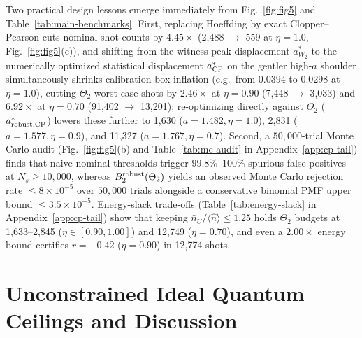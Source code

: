 \documentclass{iopjournal}
\newcommand{\nU}{\bar n_U}
\begin{document}
Two practical design lessons emerge immediately from Fig.~\ref{fig:fig5} and Table~\ref{tab:main-benchmarks}. First, replacing Hoeffding by exact Clopper--Pearson cuts nominal shot counts by $4.45\times$ (2,488 $\to$ 559 at $\eta = 1.0$, Fig.~\ref{fig:fig5}(c)), and shifting from the witness-peak displacement $a^*_{W_2}$ to the numerically optimized statistical displacement $a^*_{\rm CP}$ on the gentler high-$a$ shoulder simultaneously shrinks calibration-box inflation (e.g.\ from $0.0394$ to $0.0298$ at $\eta = 1.0$), cutting $\Theta_2$ worst-case shots by $2.46\times$ at $\eta = 0.90$ (7,448 $\to$ 3,033) and $6.92\times$ at $\eta = 0.70$ (91,402 $\to$ 13,201); re-optimizing directly against $\Theta_2$ ($a^*_{\rm robust,CP}$) lowers these further to 1,630 ($a=1.482, \eta=1.0$), 2,831 ($a=1.577, \eta=0.9$), and 11,327 ($a=1.767, \eta=0.7$). Second, a $50{,}000$-trial Monte Carlo audit (Fig.~\ref{fig:fig5}(b) and Table~\ref{tab:mc-audit} in Appendix~\ref{app:cp-tail}) finds that naive nominal thresholds trigger $99.8\%$--$100\%$ spurious false positives at $N_s \ge 10{,}000$, whereas $B_2^{\rm robust}(\Theta_2)$ yields an observed Monte Carlo rejection rate $\le 8\times 10^{-5}$ over $50{,}000$ trials alongside a conservative binomial PMF upper bound $\le 3.5\times 10^{-5}$. Energy-slack trade-offs (Table~\ref{tab:energy-slack} in Appendix~\ref{app:cp-tail}) show that keeping $\nU/\langle\hat n\rangle \le 1.25$ holds $\Theta_2$ budgets at 1,633--2,845 ($\eta \in [0.90, 1.00]$) and 12,749 ($\eta = 0.70$), and even a $2.00\times$ energy bound certifies $r=-0.42$ ($\eta=0.90$) in 12,774 shots.

\section{Unconstrained Ideal Quantum Ceilings and Discussion}\label{sec:quantum-ceilings}
\end{document}

